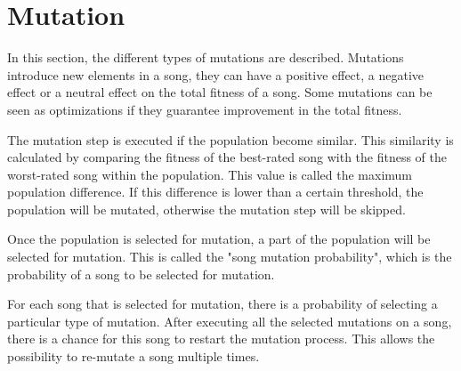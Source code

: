 \section{Mutation}
In this section, the different types of mutations are described. Mutations introduce new elements in a song, they can have a positive effect, a negative effect or a neutral effect on the total fitness of a song. Some mutations can be seen as optimizations if they guarantee improvement in the total fitness. 

The mutation step is executed if the population become similar. This similarity is calculated by comparing the fitness of the best-rated song with the fitness of the worst-rated song within the population. This value is called the maximum population difference. If this difference is lower than a certain threshold, the population will be mutated, otherwise the mutation step will be skipped. 

Once the population is selected for mutation, a part of the population will be selected for mutation. This is called the "song mutation probability", which is the probability of a song to be selected for mutation.

For each song that is selected for mutation, there is a probability of selecting a particular type of mutation. After executing all the selected mutations on a song, there is a chance for this song to restart the mutation process. This allows the possibility to re-mutate a song multiple times.






